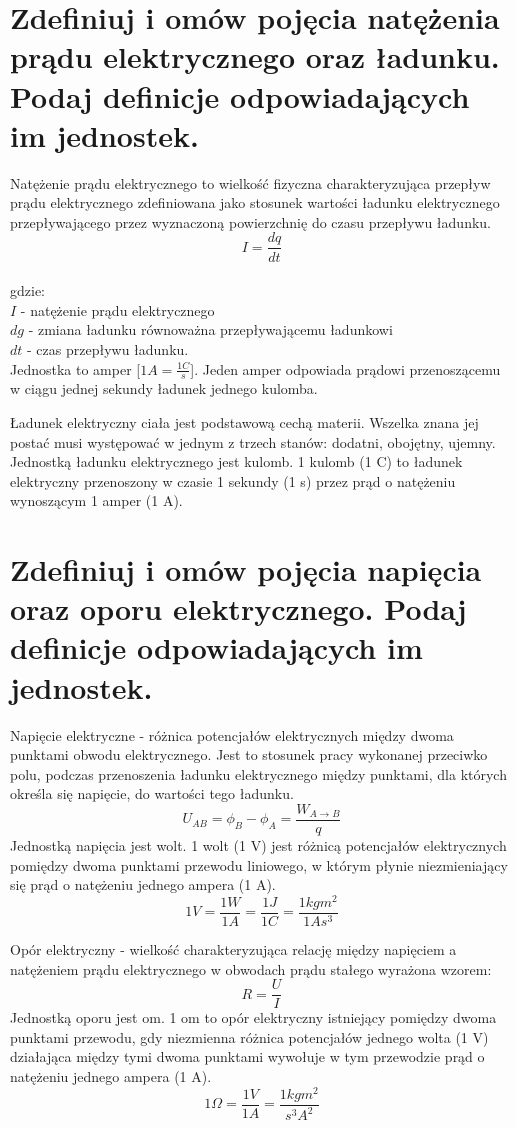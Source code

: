 \documentclass[a4paper,11pt]{article} %
\begin{document}
\section{Zdefiniuj i omów pojęcia natężenia prądu elektrycznego oraz ładunku. Podaj
definicje odpowiadających im jednostek.}
Natężenie prądu elektrycznego to wielkość fizyczna charakteryzująca przepływ prądu elektrycznego zdefiniowana jako stosunek wartości ładunku elektrycznego przepływającego przez wyznaczoną powierzchnię do czasu przepływu ładunku.
$$ I = \frac{dq}{dt}$$\\
gdzie:\\
$I$ - natężenie prądu elektrycznego\\
$dg$ - zmiana ładunku równoważna przepływającemu ładunkowi\\
$dt$ - czas przepływu ładunku.\\
Jednostka to amper [$1A = \frac{1C}{s}$]. Jeden amper odpowiada prądowi przenoszącemu w ciągu jednej sekundy ładunek jednego kulomba.

Ładunek elektryczny ciała jest podstawową cechą materii. Wszelka znana jej postać musi występować w jednym z trzech stanów: dodatni, obojętny, ujemny. Jednostką ładunku elektrycznego jest kulomb. 1 kulomb (1 C) to ładunek elektryczny przenoszony w czasie 1 sekundy (1 s) przez prąd o natężeniu wynoszącym 1 amper (1 A).

\section{Zdefiniuj i omów pojęcia napięcia oraz oporu elektrycznego. Podaj definicje
odpowiadających im jednostek.}
Napięcie elektryczne - różnica potencjałów elektrycznych między dwoma punktami obwodu elektrycznego. Jest to stosunek pracy wykonanej przeciwko polu, podczas przenoszenia ładunku elektrycznego między punktami, dla których określa się napięcie, do wartości tego ładunku.
$$ U_{AB} = \phi_B - \phi_A = \frac{W_{A\rightarrow B}}{q}$$
Jednostką napięcia jest wolt. 1 wolt (1 V) jest różnicą potencjałów elektrycznych pomiędzy dwoma punktami przewodu liniowego, w którym płynie niezmieniający się prąd o natężeniu jednego ampera (1 A). 
$$1V = \frac{1W}{1A} = \frac{1J}{1C} = \frac{1kgm^2}{1As^3}$$

Opór elektryczny - wielkość charakteryzująca relację między napięciem a natężeniem prądu elektrycznego w obwodach prądu stałego wyrażona wzorem: 
$$R = \frac{U}{I}$$
Jednostką oporu jest om. 1 om to opór elektryczny istniejący pomiędzy dwoma punktami przewodu, gdy niezmienna różnica potencjałów jednego wolta (1 V) działająca między tymi dwoma punktami wywołuje w tym przewodzie prąd o natężeniu jednego ampera (1 A).
$$1 \Omega = \frac{1V}{1A} = \frac{1kgm^2}{s^3A^2}$$
\end{document}
